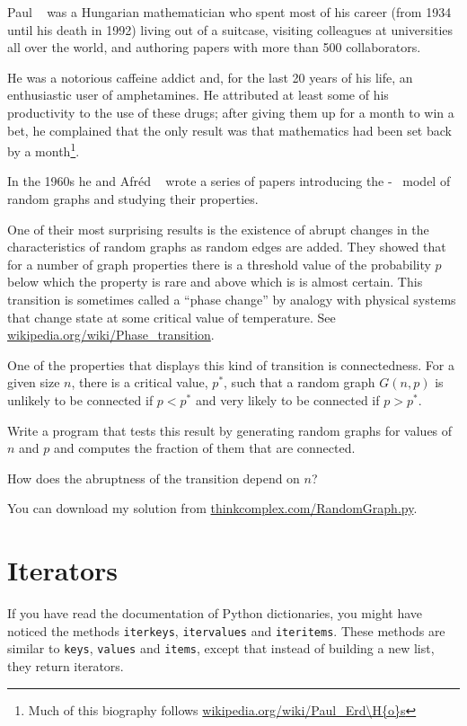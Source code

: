 \documentclass[10pt]{book}
\begin{document}
Paul \Erdos~ was a Hungarian mathematician who spent most
of his career (from 1934 until his death in 1992) living out
of a suitcase, visiting colleagues at universities all over the
world, and authoring papers with more than 500 collaborators.

He was a notorious caffeine addict and, for the last 20 years of his
life, an enthusiastic user of amphetamines.  He attributed at least
some of his productivity to the use of these drugs; after giving them
up for a month to win a bet, he complained that the only result
was that mathematics had
been set back by a month\footnote{Much of this biography follows
\url{wikipedia.org/wiki/Paul_Erd\H{o}s}}.

In the 1960s he and Afr\'{e}d \Renyi~ wrote a series of papers 
introducing the \Erdos-\Renyi~
model of random graphs and studying their properties.

One of their most surprising results is the existence of
abrupt changes in the characteristics of random graphs as
random edges are added.  They showed that for a number of
graph properties there is a threshold value of the probability
$p$ below which the property is rare and above which is
is almost certain.  This transition is sometimes called
a ``phase change'' by analogy with physical systems that
change state at some critical value of temperature.
See \url{wikipedia.org/wiki/Phase_transition}.


\begin{ex}

One of the properties that displays this kind of transition is
connectedness.  For a given size $n$, there is a critical value,
$p^*$, such that a random graph $G(n, p)$ is unlikely to be connected
if $p < p^*$ and very likely to be connected if $p > p^*$.

Write a program that tests this result by generating random graphs for
values of $n$ and $p$ and computes the fraction of them that
are connected.

How does the abruptness of the transition depend on $n$?

You can download my solution from
\url{thinkcomplex.com/RandomGraph.py}.

\end{ex}


\section{Iterators}

If you have read the documentation of Python dictionaries,
you might have noticed the methods {\tt iterkeys}, {\tt itervalues}
and {\tt iteritems}.  These methods are similar to {\tt keys},
{\tt values} and {\tt items}, except that instead of building
a new list, they return iterators.
\end{document}

